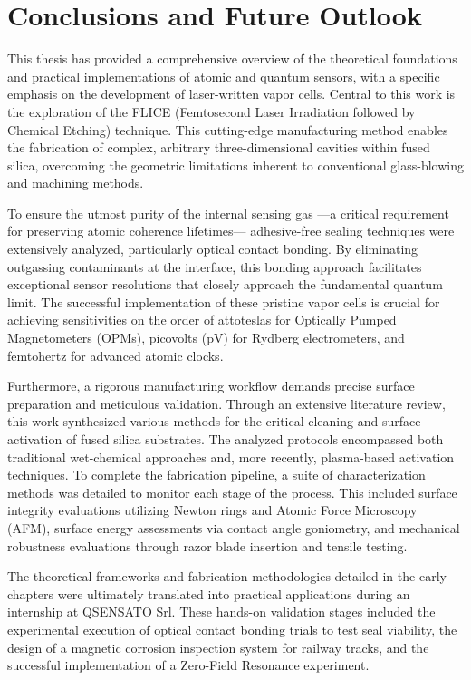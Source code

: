 \FloatBarrier
\chapter{Conclusions and Future Outlook}
\label{chap:conclusions}

This thesis has provided a comprehensive overview of the theoretical foundations
and practical implementations of atomic and quantum sensors, with a specific
emphasis on the development of laser-written vapor cells. Central to this work
is the exploration of the FLICE (Femtosecond Laser Irradiation followed by
Chemical Etching) technique. This cutting-edge manufacturing method enables the
fabrication of complex, arbitrary three-dimensional cavities within fused silica,
overcoming the geometric limitations inherent to conventional glass-blowing and
machining methods.

To ensure the utmost purity of the internal sensing gas ---a critical requirement
for preserving atomic coherence lifetimes--- adhesive-free sealing techniques were
extensively analyzed, particularly optical contact bonding. By eliminating
outgassing contaminants at the interface, this bonding approach facilitates
exceptional sensor resolutions that closely approach the fundamental quantum
limit. The successful implementation of these pristine vapor cells is crucial
for achieving sensitivities on the order of attoteslas for Optically Pumped
Magnetometers (OPMs), picovolts (pV) for Rydberg electrometers, and femtohertz
for advanced atomic clocks.

Furthermore, a rigorous manufacturing workflow demands precise surface
preparation and meticulous validation. Through an extensive literature review,
this work synthesized various methods for the critical cleaning and surface
activation of fused silica substrates. The analyzed protocols encompassed both
traditional wet-chemical approaches and, more recently, plasma-based activation
techniques. To complete the fabrication pipeline, a suite of characterization
methods was detailed to monitor each stage of the process. This included
surface integrity evaluations utilizing Newton rings and Atomic Force Microscopy
(AFM), surface energy assessments via contact angle goniometry, and mechanical
robustness evaluations through razor blade insertion and tensile testing.

The theoretical frameworks and fabrication methodologies detailed in the early
chapters were ultimately translated into practical applications during an
internship at QSENSATO Srl. These hands-on validation stages included the
experimental execution of optical contact bonding trials to test seal viability,
the design of a magnetic corrosion inspection system for railway tracks, and
the successful implementation of a Zero-Field Resonance experiment.

